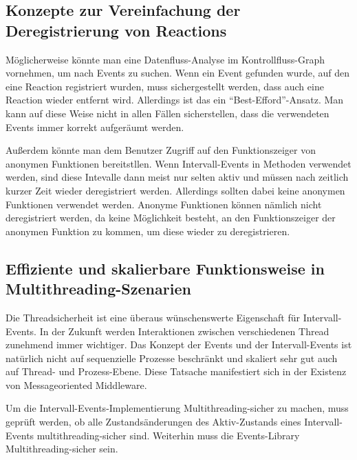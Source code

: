 \documentclass[article,colorback,accentcolor=tud4c]{tudreport}
\begin{document}
\subsection{Konzepte zur Vereinfachung der Deregistrierung von Reactions}

Möglicherweise könnte man eine Datenfluss-Analyse im Kontrollfluss-Graph
vornehmen, um nach Events zu suchen. Wenn ein Event gefunden wurde, auf den eine Reaction
registriert wurden, muss sichergestellt werden, dass auch eine Reaction wieder
entfernt wird. Allerdings ist das ein "`Best-Efford"'-Ansatz. Man kann auf diese
Weise nicht in allen Fällen sicherstellen, dass die verwendeten Events immer
korrekt aufgeräumt werden.

Außerdem könnte man dem Benutzer Zugriff auf den Funktionszeiger von
anonymen Funktionen bereitstllen. Wenn Intervall-Events in Methoden verwendet
werden, sind diese Intevalle dann meist nur selten aktiv und müssen nach 
zeitlich kurzer Zeit wieder deregistriert werden. Allerdings sollten dabei 
keine anonymen Funktionen verwendet werden. Anonyme Funktionen können nämlich 
nicht deregistriert werden, da keine Möglichkeit besteht, an den Funktionszeiger
der anonymen Funktion zu kommen, um diese wieder zu deregistrieren.

\subsection{Effiziente und skalierbare Funktionsweise in
Multithreading-Szenarien}
Die Threadsicherheit ist eine überaus wünschenswerte Eigenschaft für
Intervall-Events. In der Zukunft werden Interaktionen zwischen verschiedenen 
Thread zunehmend immer wichtiger. Das Konzept der Events und der
Intervall-Events ist natürlich nicht auf sequenzielle Prozesse beschränkt und
skaliert sehr gut auch auf Thread- und Prozess-Ebene. Diese Tatsache
manifestiert sich in der Existenz von Messageoriented
Middleware. 

Um die Intervall-Events-Implementierung Multithreading-sicher zu machen, muss
geprüft werden, ob alle Zustandsänderungen des Aktiv-Zustands eines
Intervall-Events multithreading-sicher sind. Weiterhin muss die Events-Library
Multithreading-sicher sein.

\listoffigures{}
\end{document}
